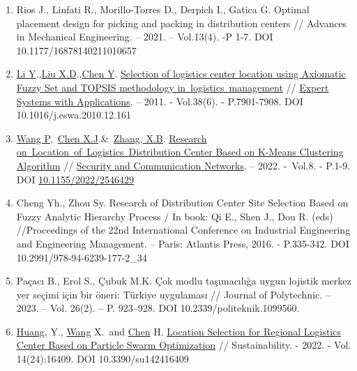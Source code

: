 \begin{enumerate}
\def\labelenumi{\arabic{enumi}.}
\item
  Rios J., Linfati R., Morillo-Torres D., Derpich I., Gatica G. Optimal
  placement design for picking and packing in distribution centers //
  Advances in Mechanical Engineering. -- 2021. -- Vol.13(4). -P 1-7. DOI
  10.1177/16878140211010657
\item
  \href{https://www.webofscience.com/wos/author/record/28556133}{Li
  Y}.,\href{https://www.webofscience.com/wos/author/record/32561100}{Liu
  X.D}.,\href{https://www.webofscience.com/wos/author/record/6098832}{Chen
  Y}.
  \href{https://www.webofscience.com/wos/woscc/full-record/WOS:000288343900166}{Selection
  of logistics center location using Axiomatic Fuzzy Set and TOPSIS
  methodology in~logistics~management} //
  \href{https://www.sciencedirect.com/journal/expert-systems-with-applications}{Expert
  Systems with Applications}. -- 2011. - Vol.38(6). - P.7901-7908. DOI
  10.1016/j.eswa.2010.12.161
\item
  \href{https://www.webofscience.com/wos/author/record/14795379}{Wang
  P},~\href{https://www.webofscience.com/wos/author/record/36107182}{Chen
  X.J}.\&~\href{https://www.webofscience.com/wos/author/record/32493117}{Zhang,
  X.B}.
  \href{https://www.webofscience.com/wos/woscc/full-record/WOS:000830775300005}{Research
  on~Location~of~Logistics~Distribution Center Based on K-Means
  Clustering Algorithm} //
  \href{https://www.researchgate.net/journal/Security-and-Communication-Networks-1939-0122}{Security
  and Communication Networks}. -- 2022. -~Vol.8. - P.1-9. DOI
  \href{http://dx.doi.org/10.1155/2022/2546429}{10.1155/2022/2546429}
\item
  Cheng Yh., Zhou Sy. Research of Distribution Center Site Selection
  Based on Fuzzy Analytic Hierarchy Process / In book: Qi E., Shen J.,
  Dou R. (eds) //Proceedings of the 22nd International Conference on
  Industrial Engineering and Engineering Management. -- Paris: Atlantis
  Press, 2016. - P.335-342. DOI 10.2991/978-94-6239-177-2\_34
\item
  Paçacı B., Erol S., Çubuk M.K. Çok modlu taşımacılığa uygun lojistik
  merkez yer seçimi için bir öneri: Türkiye uygulaması // Journal of
  Polytechnic. -- 2023. -- Vol. 26(2). -- P. 923--928. DOI
  10.2339/politeknik.1099560.
\item
  \href{https://sciprofiles.com/profile/693277}{Huang}, Y.,
  \href{https://sciprofiles.com/profile/2635021}{Wang} X.~and
  \href{https://sciprofiles.com/profile/author/dFBVb3FoaXR6WVFmWlV5M0h1dGNXZz09}{Chen}
  H. \href{https://www.mdpi.com/2071-1050/14/24/16409}{Location
  Selection for Regional Logistics Center Based on Particle Swarm
  Optimization} // Sustainability. - 2022. - Vol. 14(24):16409. DOI
  10.3390/su142416409
\end{enumerate}

